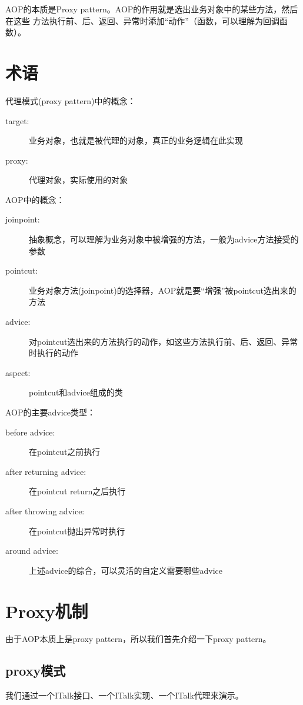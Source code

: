 \documentclass[a4paper,11pt]{article}
\begin{document}
AOP的本质是Proxy pattern。AOP的作用就是选出业务对象中的某些方法，然后在这些
方法执行前、后、返回、异常时添加“动作”（函数，可以理解为回调函数）。


\section[术语]{术语}
代理模式(proxy pattern)中的概念：

\begin{description}
\item [target: ] 业务对象，也就是被代理的对象，真正的业务逻辑在此实现
\item [proxy: ] 代理对象，实际使用的对象
\end{description}

AOP中的概念：

\begin{description}
\item [joinpoint: ] 抽象概念，可以理解为业务对象中被增强的方法，一般为advice方法接受的参数
\item [pointcut: ] 业务对象方法(joinpoint)的选择器，AOP就是要“增强”被pointcut选出来的方法
\item [advice: ] 对pointcut选出来的方法执行的动作，如这些方法执行前、后、返回、异常时执行的动作
\item [aspect: ] pointcut和advice组成的类
\end{description}

AOP的主要advice类型：

\begin{description}
\item [before advice: ] 在pointcut之前执行
\item [after returning advice: ] 在pointcut return之后执行
\item [after throwing advice: ] 在pointcut抛出异常时执行
\item [around advice: ] 上述advice的综合，可以灵活的自定义需要哪些advice
\end{description}

\section[Proxy机制]{Proxy机制}
由于AOP本质上是proxy pattern，所以我们首先介绍一下proxy pattern。

\subsection[proxy模式]{proxy模式}
我们通过一个ITalk接口、一个ITalk实现、一个ITalk代理来演示。
\end{document}
